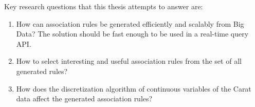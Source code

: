 Key research questions that this thesis attempts to answer are:

\begin{enumerate}
	\item How can association rules be generated efficiently and scalably from Big Data? The solution should be fast enough to be used in a real-time query API. 
	
	\item How to select interesting and useful association rules from the set of all generated rules? 
	
	\item How does the discretization algorithm of continuous variables of the Carat data affect the generated association rules? 
\end{enumerate}  




